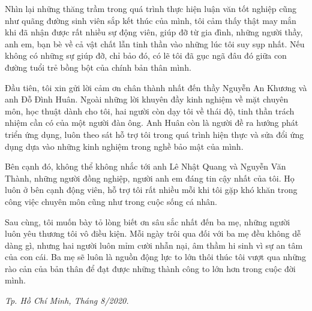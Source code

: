 \cleardoublepage
{}

\begin{dedication}
Nhìn lại những thăng trầm trong quá trình thực hiện luận văn tốt nghiệp cũng như quãng đường sinh viên sắp kết thúc của mình, tôi cảm thấy thật may mắn khi đã nhận được rất nhiều sự động viên, giúp đỡ từ gia đình, những người thầy, anh em, bạn bè về cả vật chất lẫn tinh thần vào những lúc tôi suy sụp nhất. Nếu không có những sự giúp đỡ, chỉ bảo đó, có lẽ tôi đã gục ngã đâu đó giữa con đường tuổi trẻ bồng bột của chính bản thân mình.\par
Đầu tiên, tôi xin gửi lời cảm ơn chân thành nhất đến thầy Nguyễn An Khương và anh Đỗ Đình Huân. Ngoài những lời khuyên đầy kinh nghiệm về mặt chuyên môn, học thuật dành cho tôi, hai người còn dạy tôi về thái độ, tinh thần trách nhiệm cần có của một người đàn ông. Anh Huân còn là người đề ra hướng phát triển ứng dụng, luôn theo sát hỗ trợ tôi trong quá trình hiện thực và sửa đổi ứng dụng dựa vào những kinh nghiệm trong nghề bảo mật của mình.\par
Bên cạnh đó, không thể không nhắc tới anh Lê Nhật Quang và Nguyễn Văn Thành, những người đồng nghiệp, người anh em đáng tin cậy nhất của tôi. Họ luôn ở bên cạnh động viên, hỗ trợ tôi rất nhiều mỗi khi tôi gặp khó khăn trong công việc chuyên môn cũng như trong cuộc sống cá nhân.\par
Sau cùng, tôi muốn bày tỏ lòng biết ơn sâu sắc nhất đến ba mẹ, những người luôn yêu thương tôi vô điều kiện. Mỗi ngày trôi qua đối với ba mẹ đều không dễ dàng gì, nhưng hai người luôn mỉm cười nhẫn nại, âm thầm hi sinh vì sự an tâm của con cái. Ba mẹ sẽ luôn là nguồn động lực to lớn thôi thúc tôi vượt qua những rào cản của bản thân để đạt được những thành công to lớn hơn trong cuộc đời mình.
\begin{flushright}
    \textit{Tp. Hồ Chí Minh, Tháng 8/2020.}
\end{flushright}
\end{dedication}
